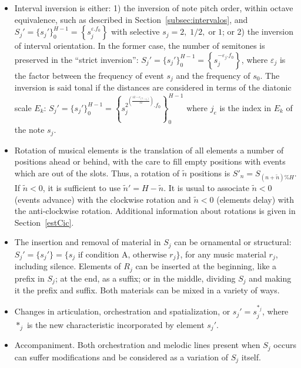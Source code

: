 \begin{itemize}
        \item Interval inversion is either: 1) the inversion of note pitch order, within octave equivalence, such as described in Section~\ref{subsec:intervalos}, and $S_j'=\{s_j'\}_0^{H-1}=\left\{s_j^{\varepsilon. f_0}\right\}$ with selective $s_j=2,\;1/2,\;\text{or}\;1$; or 2) the inversion of interval orientation. In the former case, the number of semitones
        is preserved in the ``strict inversion'':
        $S_j'=\{s_j'\}_0^{H-1}=\left\{s_j^{-\varepsilon_j . f_0}\right\}$, where
        $\varepsilon_j$ is the factor between the frequency of event $s_j$ and the
        frequency of $s_0$. The inversion is said tonal if the distances are
        considered in terms of the diatonic scale $E_k$:
        $S_j'=\{s_j'\}_0^{H-1}=\left\{s_j^{2^{\left(\frac{12-e_{\left(7-j_e\right)}}{12}\right)}
        . f_0}\right\}_0^{H-1}$ where $j_e$ is the index in
        $E_k$ of the note $s_j$.

        \item Rotation of musical elements is the translation of all elements
        a number of positions ahead or behind, with the care to fill empty positions
        with events which are out of the slots. Thus, a
        rotation of $\tilde{n}$ positions is $S'_n=S_{(n+\tilde{n})\%H}$. If
        $\tilde{n}<0$, it is sufficient to use $\tilde{n}'=H-\tilde{n}$. It is
        usual to associate $\tilde{n}<0$ (events advance) with the clockwise rotation and
        $\tilde{n}<0$ (elements delay) with the anti-clockwise rotation.
        Additional information about rotations is given in Section~\ref{estCic}.

        \item The insertion and removal of material in $S_j$ can be
    ornamental or structural: $S_j'=\{s_j'\}=\{s_j \text{ if condition A,
    otherwise } r_j\}$, for any music material $r_j$, including silence.
    Elements of $R_j$ can be inserted at the beginning, like a prefix
    in $S_j$; at the end, as a suffix; or in the middle, dividing $S_j$ and making
    it the prefix and suffix. Both materials can be mixed in a variety of ways.

    \item Changes in articulation, orchestration and spatialization, or
    $s_j'=s_j^{*_j}$, where $*_j$ is the new characteristic incorporated by 
    element $s_j'$.
    
    \item Accompaniment. Both orchestration and melodic lines present when $S_j$ occurs can suffer modifications and be considered as a variation of $S_j$ itself.
\end{itemize}

